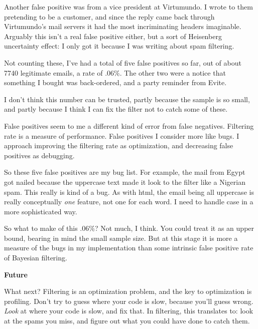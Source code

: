 Another false positive was from a vice
                  president at Virtumundo. I wrote to them pretending to be a
                  customer, and since the reply came back through Virtumundo's
                  mail servers it had the most incriminating headers imaginable.
                  Arguably this isn't a real false positive either, but a sort
                  of Heisenberg uncertainty effect: I only got it because I was
                  writing about spam filtering.

Not counting these,
                  I've had a total of five false positives so far, out of about
                  7740 legitimate emails, a rate of .06\%. The other two were a
                  notice that something I bought was back-ordered, and a party
                  reminder from Evite.

I don't think this number can
                  be trusted, partly because the sample is so small, and partly
                  because I think I can fix the filter not to catch some of
                  these.

False positives seem to me a different kind
                  of error from false negatives. Filtering rate is a measure of
                  performance. False positives I consider more like bugs. I
                  approach improving the filtering rate as optimization, and
                  decreasing false positives as debugging.

So these
                  five false positives are my bug list. For example, the mail
                  from Egypt got nailed because the uppercase text made it look
                  to the filter like a Nigerian spam. This really is kind of a
                  bug. As with html, the email being all uppercase is really
                  conceptually \emph{one} feature, not one for each word. I need
                  to handle case in a more sophisticated way.

So what
                  to make of this .06\%? Not much, I think. You could treat it as
                  an upper bound, bearing in mind the small sample size. But at
                  this stage it is more a measure of the bugs in my
                  implementation than some intrinsic false positive rate of
                  Bayesian filtering.

\textbf{Future}

What
                  next? Filtering is an optimization problem, and the key to
                  optimization is profiling. Don't try to guess where your code
                  is slow, because you'll guess wrong. \emph{Look} at where your
                  code is slow, and fix that. In filtering, this translates to:
                  look at the spams you miss, and figure out what you could have
                  done to catch them.

